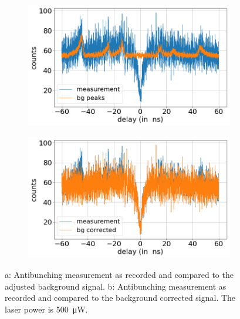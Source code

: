 \begin{figure}[H]
    \centering
    \begin{subfigure}{0.47\textwidth}
        \centering
        \includegraphics[width=1.0\textwidth]{img/output_t2/500.0muW_bg_peaks.png}
    \caption{}
    \end{subfigure}
    \begin{subfigure}{0.47\textwidth}
        \centering
        \includegraphics[width=\textwidth]{img/output_t2/500.0muW_bg_vgl.png}
        \caption{}
    \end{subfigure}
    \caption{a: Antibunching measurement as recorded and compared to the adjusted background signal. b: Antibunching measurement as recorded and compared to the background corrected signal. The laser power is \SI{500}{\micro W}.} %
\end{figure}
